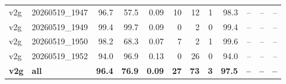 \begin{table}[t]
\begin{tabular}{llrrrrrrrrrr}
v2g & 20260519\_1947 & 96.7 & 57.5 & 0.09 & 10 & 12 & 1 & 98.3 & -- & -- & -- \\
v2g & 20260519\_1949 & 99.4 & 99.7 & 0.09 & 0 & 2 & 0 & 99.4 & -- & -- & -- \\
v2g & 20260519\_1950 & 98.2 & 68.3 & 0.07 & 7 & 2 & 1 & 99.6 & -- & -- & -- \\
v2g & 20260519\_1952 & 94.0 & 96.9 & 0.13 & 0 & 26 & 0 & 94.0 & -- & -- & -- \\
\textbf{v2g} & \textbf{all} & \textbf{96.4} & \textbf{76.9} & \textbf{0.09} & \textbf{27} & \textbf{73} & \textbf{3} & \textbf{97.5} & \textbf{--} & \textbf{--} & \textbf{--} \\
\bottomrule
\end{tabular}
\end{table}
